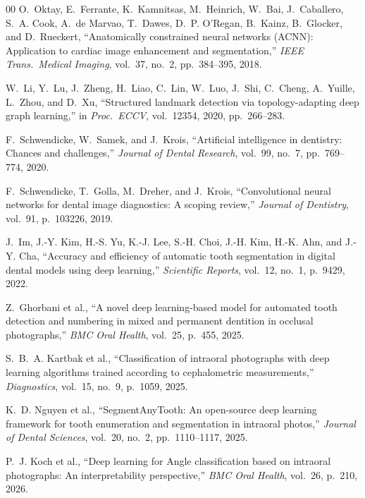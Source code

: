 \documentclass[conference]{IEEEtran}
\begin{document}
\begin{thebibliography}{00}
O.~Oktay, E.~Ferrante, K.~Kamnitsas, M.~Heinrich, W.~Bai, J.~Caballero, S.~A. Cook,
A.~de Marvao, T.~Dawes, D.~P. O'Regan, B.~Kainz, B.~Glocker, and D.~Rueckert,
``Anatomically constrained neural networks (ACNN): Application to cardiac image enhancement
and segmentation,''
\textit{IEEE Trans.\ Medical Imaging}, vol.~37, no.~2, pp.~384--395, 2018.

W.~Li, Y.~Lu, J.~Zheng, H.~Liao, C.~Lin, W.~Luo, J.~Shi, C.~Cheng, A.~Yuille,
L.~Zhou, and D.~Xu,
``Structured landmark detection via topology-adapting deep graph learning,''
in \textit{Proc.\ ECCV}, vol.~12354, 2020, pp.~266--283.

F.~Schwendicke, W.~Samek, and J.~Krois,
``Artificial intelligence in dentistry: Chances and challenges,''
\textit{Journal of Dental Research}, vol.~99, no.~7, pp.~769--774, 2020.

F.~Schwendicke, T.~Golla, M.~Dreher, and J.~Krois,
``Convolutional neural networks for dental image diagnostics: A scoping review,''
\textit{Journal of Dentistry}, vol.~91, p.~103226, 2019.

J.~Im, J.-Y. Kim, H.-S. Yu, K.-J. Lee, S.-H. Choi, J.-H. Kim, H.-K. Ahn, and J.-Y. Cha,
``Accuracy and efficiency of automatic tooth segmentation in digital dental models using deep
learning,''
\textit{Scientific Reports}, vol.~12, no.~1, p.~9429, 2022.

Z.~Ghorbani et al.,
``A novel deep learning-based model for automated tooth detection and numbering in mixed and
permanent dentition in occlusal photographs,''
\textit{BMC Oral Health}, vol.~25, p.~455, 2025.

S.~B.~A. Kartbak et al.,
``Classification of intraoral photographs with deep learning algorithms trained according to
cephalometric measurements,''
\textit{Diagnostics}, vol.~15, no.~9, p.~1059, 2025.

K.~D. Nguyen et al.,
``SegmentAnyTooth: An open-source deep learning framework for tooth enumeration and
segmentation in intraoral photos,''
\textit{Journal of Dental Sciences}, vol.~20, no.~2, pp.~1110--1117, 2025.

P.~J. Koch et al.,
``Deep learning for Angle classification based on intraoral photographs: An interpretability
perspective,''
\textit{BMC Oral Health}, vol.~26, p.~210, 2026.


\end{thebibliography}
\end{document}

